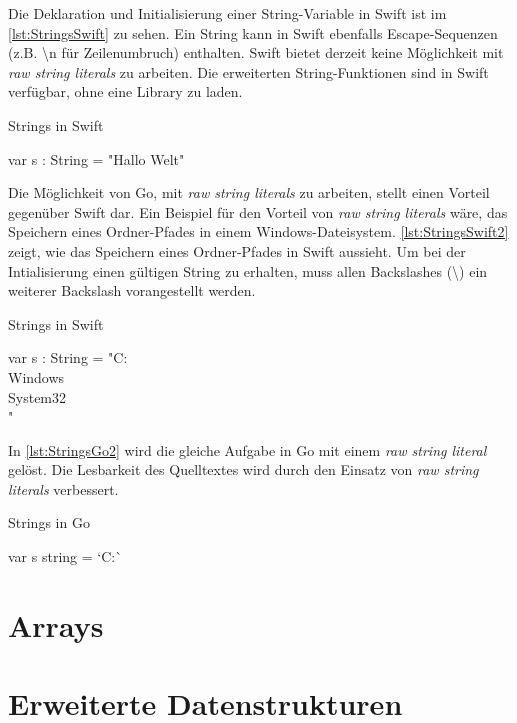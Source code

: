 Die Deklaration und Initialisierung einer String-Variable in Swift ist im \autoref{lst:StringsSwift} zu sehen.
Ein String kann in Swift ebenfalls Escape-Sequenzen (z.B. {\textbackslash}n für Zeilenumbruch) enthalten.
Swift bietet derzeit keine Möglichkeit mit \emph{raw string literals} zu arbeiten. 
Die erweiterten String-Funktionen sind in Swift verfügbar, ohne eine Library zu laden.

\begin{listing}
\caption{Strings in Swift}
\label{lst:StringsSwift}
\begin{SwiftCode}
var s : String = "Hallo Welt"
\end{SwiftCode}
\end{listing}

Die Möglichkeit von Go, mit \emph{raw string literals} zu arbeiten, stellt einen Vorteil gegenüber Swift dar. 
Ein Beispiel für den Vorteil von \emph{raw string literals} wäre, das Speichern eines Ordner-Pfades in einem Windows-Dateisystem.
\autoref{lst:StringsSwift2} zeigt, wie das Speichern eines Ordner-Pfades in Swift aussieht.
Um bei der Intialisierung einen gültigen String zu erhalten, muss allen Backslashes (\textbackslash) ein weiterer Backslash vorangestellt werden. 

\begin{listing}
\caption{Strings in Swift}
\label{lst:StringsSwift2}
\begin{SwiftCode}
var s : String = "C:\\Windows\\System32\\"
\end{SwiftCode}
\end{listing}

In \autoref{lst:StringsGo2} wird die gleiche Aufgabe in Go mit einem \emph{raw string literal} gelöst. 
Die Lesbarkeit des Quelltextes wird durch den Einsatz von \emph{raw string literals} verbessert.

\begin{listing}
\caption{Strings in Go}
\label{lst:StringsGo2}
\begin{GoCode}
var s string = `C:\Windows{}\`
\end{GoCode}
\end{listing}

\section{Arrays}

\section{Erweiterte Datenstrukturen}


